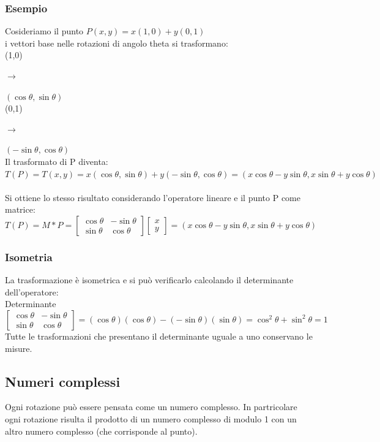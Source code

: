 \documentclass[a4paper]{article}
\begin{document}
\subsubsection{Esempio}
Cosideriamo il punto $P(x,y)= x(1,0)+y(0,1)$
\\ i vettori base nelle rotazioni di angolo theta si trasformano: 
\\ (1,0) \begin{large} $\rightarrow$ \end{large} $(\cos\theta, \sin\theta)
$
\\ (0,1) \begin{large} $\rightarrow$ \end{large} $(-\sin\theta, \cos\theta)
$
\\ Il trasformato di P diventa:
\\ $T(P)=T(x,y)=x(\cos\theta,\sin\theta)+y(-\sin\theta,\cos\theta)= (x\cos\theta-y\sin\theta,x\sin\theta+y\cos\theta)
$
\\
\\ Si ottiene lo stesso risultato considerando l'operatore lineare e il punto P come matrice:
\\ $T(P)= M*P=\left[\begin{matrix}\cos\theta & -\sin\theta\\ \sin\theta & \cos\theta\end{matrix}\right]\left[\begin{matrix}x\\ y\end{matrix}\right]=(x\cos\theta-y\sin\theta,x\sin\theta+y\cos\theta)
$
\subsubsection{Isometria}
La trasformazione è isometrica e si può verificarlo calcolando il determinante dell'operatore:
\\Determinante$\left[\begin{matrix}\cos\theta & -\sin\theta\\ \sin\theta & \cos\theta\end{matrix}\right]= (\cos\theta)(\cos\theta)-(-\sin\theta)(\sin\theta)= \cos^2\theta+\sin^2\theta=1
$
\\Tutte le trasformazioni che presentano il determinante uguale a uno conservano le misure.
\subsection{Numeri complessi}
Ogni rotazione può essere pensata come un numero complesso. In partricolare ogni rotazione risulta il prodotto di un numero complesso di modulo 1 con un altro numero complesso (che corrisponde al punto).
\end{document}

